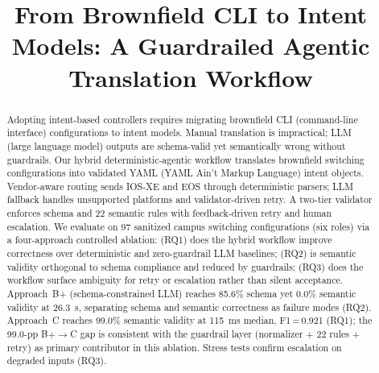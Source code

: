 \documentclass[conference]{IEEEtran}
\begin{document}
\title{From Brownfield CLI to Intent Models: A Guardrailed Agentic Translation Workflow}

\author{
\and
{}
\and
{}
\and
{}
}

\maketitle

\begin{abstract}
Adopting intent-based controllers requires migrating brownfield CLI (command-line interface) configurations to intent models. Manual translation is impractical; LLM (large language model) outputs are schema-valid yet semantically wrong without guardrails. Our hybrid deterministic-agentic workflow translates brownfield switching configurations into validated YAML (YAML Ain't Markup Language) intent objects. Vendor-aware routing sends IOS-XE and EOS through deterministic parsers; LLM fallback handles unsupported platforms and validator-driven retry. A two-tier validator enforces schema and 22 semantic rules with feedback-driven retry and human escalation. We evaluate on 97 sanitized campus switching configurations (six roles) via a four-approach controlled ablation: (RQ1) does the hybrid workflow improve correctness over deterministic and zero-guardrail LLM baselines; (RQ2) is semantic validity orthogonal to schema compliance and reduced by guardrails; (RQ3) does the workflow surface ambiguity for retry or escalation rather than silent acceptance. Approach~B+ (schema-constrained LLM) reaches 85.6\% schema yet 0.0\% semantic validity at 26.3~s, separating schema and semantic correctness as failure modes (RQ2). Approach~C reaches 99.0\% semantic validity at 115~ms median, F1\,=\,0.921 (RQ1); the 99.0-pp B+$\to$C gap is consistent with the guardrail layer (normalizer + 22 rules + retry) as primary contributor in this ablation. Stress tests confirm escalation on degraded inputs (RQ3).
\end{abstract}
\end{document}
